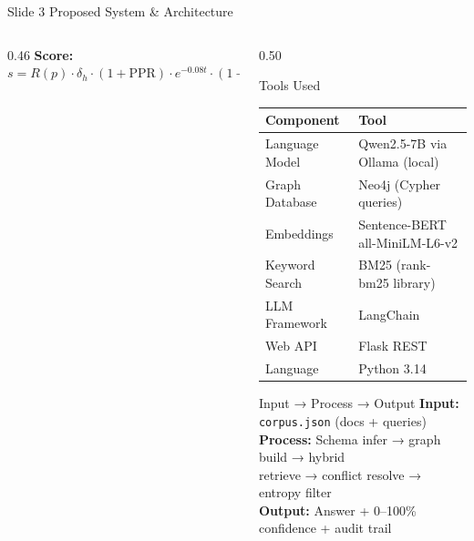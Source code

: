 \documentclass[aspectratio=169, 10pt]{beamer}
\begin{document}
\begin{frame}{Slide 3 \quad Proposed System \& Architecture}
\begin{columns}[T]
\begin{column}{0.46\textwidth}
  \vspace{6pt}
  \scriptsize
  \textbf{Score:}\;
  $s = R(p)\cdot\delta_h\cdot(1{+}\text{PPR})\cdot e^{-0.08t}\cdot(1{+}\ln(1{+}n){\cdot}0.8)$
\end{column}
\begin{column}{0.50\textwidth}
  \begin{block}{\small Tools Used}
    \scriptsize
    \begin{tabular}{ll}
      \toprule
      \textbf{Component} & \textbf{Tool} \\
      \midrule
      Language Model    & Qwen2.5-7B via Ollama (local) \\
      Graph Database    & Neo4j (Cypher queries) \\
      Embeddings        & Sentence-BERT all-MiniLM-L6-v2 \\
      Keyword Search    & BM25 (rank-bm25 library) \\
      LLM Framework     & LangChain \\
      Web API           & Flask REST \\
      Language          & Python 3.14 \\
      \bottomrule
    \end{tabular}
  \end{block}
  \vspace{4pt}
  \begin{block}{\small Input → Process → Output}
    \scriptsize
    \textbf{Input:} \texttt{corpus.json} (docs + queries)\\
    \textbf{Process:} Schema infer → graph build → hybrid\\
    \quad retrieve → conflict resolve → entropy filter\\
    \textbf{Output:} Answer + 0–100\% confidence + audit trail
  \end{block}
\end{column}
\end{columns}

\end{frame}
\end{document}
